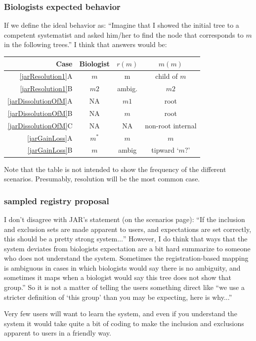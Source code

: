 \documentclass[11pt]{article}
\begin{document}
\subsubsection{Biologists expected behavior}
If we define the ideal behavior as:
  ``Imagine that I showed the initial tree to a competent systematist
  and asked him/her
  to find the node that corresponds to $m$ in the following trees.''
I think that answers would be:\\
\begin{table}[h]
\centering
\begin{tabular}{r|c|c|c}
Case & Biologist & $r(m)$ & $m(m)$ \\
\hline
\ref{jarResolution1}A & $m$ & m & child of $m$ \\
\ref{jarResolution1}B & $m2$ & ambig. & $m2$ \\
\ref{jarDissolutionOfM}A & NA & $m1$ & root \\
\ref{jarDissolutionOfM}B & NA & $m$ & root \\
\ref{jarDissolutionOfM}C & NA & NA & non-root internal \\
\ref{jarGainLoss}A & $m^{\ast}$ & $m$ & $m$ \\
\ref{jarGainLoss}B & $m$ & ambig & tipward `$m?$' \\
\hline
\end{tabular}
\end{table}
Note that the table is not intended to show the frequency of the different scenarios.
Presumably, resolution will be the most common case.

\subsubsection{sampled registry proposal}
I don't disagree with JAR's statement (on the scenarios page): ``If the inclusion and exclusion sets are made apparent to users, and expectations are set correctly, this should be a pretty strong system$\ldots$''
However, I do think that ways that the system deviates from biologists
  expectation are a bit hard summarize to someone who does not understand the system.
Sometimes the registration-based mapping is ambiguous in cases in which biologists
  would say there is no ambiguity, and sometimes it maps when a biologist would say 
  this tree does not show that group.''
So it is not a matter of telling the users something direct like
  ``we use a stricter definition of `this group' than you may be expecting, here is why...''

Very few users will want to learn the system, and even if you understand the 
  system it would take quite a bit of coding to make the inclusion and exclusions apparent to users in a friendly way.
\end{document}
